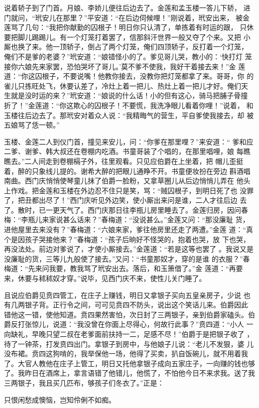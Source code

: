 说着轿子到了门首。月娘、李娇儿便往后边去了。金莲和孟玉楼一答儿下轿，
进门就问，“玳安儿在那里？”平安道：“在后边伺候哩！”刚说着，玳安出来，
被金莲骂了几句：“我把你献勤的囚根子！明日你只认清了，单拣着有时运的跟，
只休要把脚儿踢踢儿。有一个灯笼打着罢了，信那斜汗世界一般又夺了个来。又把
小厮也换了来。他一顶轿子，倒占了两个灯笼，俺们四顶轿子，反打着一个灯笼，
俺们不是爹的老婆？”玳安道：“娘错怪小的了。爹见哥儿哭，教小的：‘快打灯
笼接你六娘先来家罢，恐怕哭坏了哥儿。’莫不爹不使我，我好干着接去来！”金
莲道：“你这囚根子，不要说嘴！他教你接去，没教你把灯笼都拿了来。哥哥，你
的雀儿只拣旺处飞，休要认差了，冷灶上着一把儿、热灶上着一把儿才好。俺们天
生就是没时运的来？”玳安道：“娘说的什么话！小的但有这心，骑马把脯子骨撞
折了！”金莲道：“你这欺心的囚根子！不要慌，我洗净眼儿看着你哩！”说着，
和玉楼往后边去了。那玳安对着众人说：“我精晦气的营生，平自爹使我接去，却
被五娘骂了恁一顿。”

玉楼、金莲二人到仪门首，撞见来安儿，问：“你爹在那里哩？”来安道：“
爹和应二爹、谢爹、韩大叔还在卷棚内吃酒。书童哥装了个唱的，在那里唱哩，娘
每瞧瞧去。”二人间走到卷棚槅子外，往里观看。只见应伯爵在上坐着，把
帽儿歪挺着，醉的只象线儿提的。谢希大醉的把眼儿通睁不开。书童便妆扮在旁边
斟酒唱南曲。西门庆悄悄使琴童儿抹了伯爵一脸粉，又拿草圈儿从后边悄悄儿弄在
他头上作戏。把金莲和玉楼在外边忍不住只是笑，骂：“贼囚根子，到明日死了也
没罪了，把丑都出尽了！”西门庆听见外边笑，使小厮出来问是谁，二人才往后边
去了。散时，已一更天气了。西门庆那日往李瓶儿房里睡去了。金莲归房，因问春
梅：“李瓶儿来家说甚么话来？”春梅道：“没说甚么。”金莲又问：“那没廉耻
货，进他屋里去来没有？”春梅道：“六娘来家，爹往他房里还走了两遭。”金莲
道：“真个是因孩子哭接他来？”春梅道：“孩子后晌好不怪哭的，抱着也哭，放
下也哭，再没法处。前边对爹说了，才使小厮接去。”金莲道：“若是这等也罢了
。我说又是没廉耻的货，三等儿九般使了接去。”又问：“书童那奴才，穿的是谁
的衣服？”春梅道：“先来问我要，教我骂了玳安出去。落后，和玉箫借了。”金
莲道：“再要来，休要与秫秫奴才穿。”说毕，见西门庆不来，使性儿关门睡了。

且说应伯爵见贲四管工，在庄子上赚钱，明日又拿银子买向五皇亲房子，少说
也有几两银子背。正行令之间，可可见贲四不防头，说出这个笑话儿来。伯爵因此
错他这一错，使他知道。贲四果然害怕，次日封了三两银子，亲到伯爵家磕头。伯
爵反打张惊儿，说道：“我没曾在你面上尽得心，何故行此事？”贲四道：“小人
一向缺礼，早晚只望二叔在老爹面前扶持一二，足感不尽！”伯爵于是把银子收了
，待了一钟茶，打发贲四出门。拿银子到房中，与他娘子儿说：“老儿不发狠，婆
儿没布裙。贲四这狗啃的，我举保他一场，他得了买卖，扒自饭碗儿，就不用着我
了。大官人教他在庄子上管工，明日又托他拿银子成向五家庄子，一向赚的钱也够
了。我昨日在酒席上，拿言语错了他错儿，他慌了，不怕他今日不来求我。送了我
三两银子，我且买几匹布，够孩子们冬衣了。”正是：

只恨闲愁成懊恼，岂知伶俐不如痴。